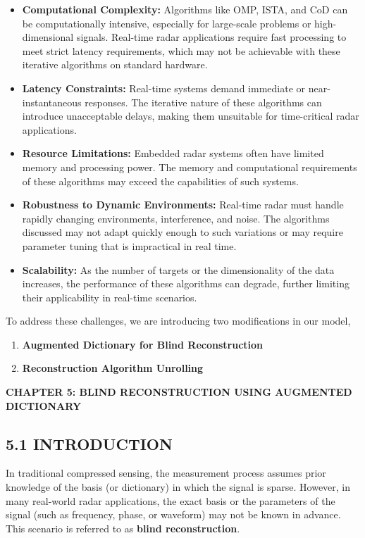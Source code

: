 \documentclass[
  letterpaper,
  DIV=11,
  numbers=noendperiod]{scrartcl}
\providecommand{\mainsection}[1]{\begin{center}{\rmfamily\textbf{\fontsize{14}{20}\selectfont #1}}\end{center}}
\begin{document}
\begin{itemize}
\item
  \textbf{Computational Complexity:} Algorithms like OMP, ISTA, and CoD
  can be computationally intensive, especially for large-scale problems
  or high-dimensional signals. Real-time radar applications require fast
  processing to meet strict latency requirements, which may not be
  achievable with these iterative algorithms on standard hardware.
\item
  \textbf{Latency Constraints:} Real-time systems demand immediate or
  near-instantaneous responses. The iterative nature of these algorithms
  can introduce unacceptable delays, making them unsuitable for
  time-critical radar applications.
\item
  \textbf{Resource Limitations:} Embedded radar systems often have
  limited memory and processing power. The memory and computational
  requirements of these algorithms may exceed the capabilities of such
  systems.
\item
  \textbf{Robustness to Dynamic Environments:} Real-time radar must
  handle rapidly changing environments, interference, and noise. The
  algorithms discussed may not adapt quickly enough to such variations
  or may require parameter tuning that is impractical in real time.
\item
  \textbf{Scalability:} As the number of targets or the dimensionality
  of the data increases, the performance of these algorithms can
  degrade, further limiting their applicability in real-time scenarios.
\end{itemize}

To address these challenges, we are introducing two modifications in our
model,

\begin{enumerate}
\def\labelenumi{\arabic{enumi}.}
\item
  \textbf{Augmented Dictionary for Blind Reconstruction}
\item
  \textbf{Reconstruction Algorithm Unrolling}
\end{enumerate}

\newpage

\mainsection{CHAPTER 5: BLIND RECONSTRUCTION USING AUGMENTED DICTIONARY}

\subsection{5.1 INTRODUCTION}\label{introduction-2}

In traditional compressed sensing, the measurement process assumes prior
knowledge of the basis (or dictionary) in which the signal is sparse.
However, in many real-world radar applications, the exact basis or the
parameters of the signal (such as frequency, phase, or waveform) may not
be known in advance. This scenario is referred to as \textbf{blind
reconstruction}.
\end{document}
